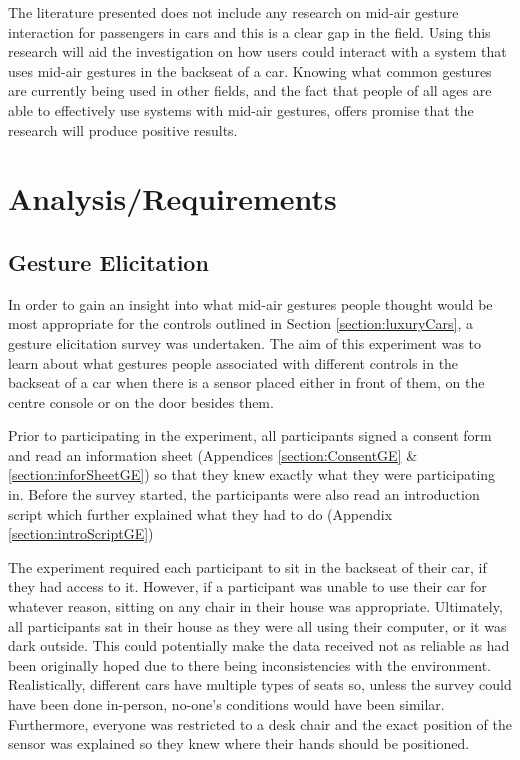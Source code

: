 \documentclass{l4proj}
\begin{document}
The literature presented does not include any research on mid-air gesture interaction for passengers in cars and this is a clear gap in the field. Using this research will aid the investigation on how users could interact with a system that uses mid-air gestures in the backseat of a car. Knowing what common gestures are currently being used in other fields, and the fact that people of all ages are able to effectively use systems with mid-air gestures, offers promise that the research will produce positive results.

\chapter{Analysis/Requirements}

\section{Gesture Elicitation}
In order to gain an insight into what mid-air gestures people thought would be most appropriate for the controls outlined in Section \ref{section:luxuryCars}, a gesture elicitation survey was undertaken. The aim of this experiment was to learn about what gestures people associated with different controls in the backseat of a car when there is a sensor placed either in front of them, on the centre console or on the door besides them. 

Prior to participating in the experiment, all participants signed a consent form and read an information sheet (Appendices \ref{section:ConsentGE} \& \ref{section:inforSheetGE}) so that they knew exactly what they were participating in. Before the survey started, the participants were also read an introduction script which further explained what they had to do (Appendix \ref{section:introScriptGE})

The experiment required each participant to sit in the backseat of their car, if they had access to it. However, if a participant was unable to use their car for whatever reason, sitting on any chair in their house was appropriate. Ultimately, all participants sat in their house as they were all using their computer, or it was dark outside. This could potentially make the data received not as reliable as had been originally hoped due to there being inconsistencies with the environment. Realistically, different cars have multiple types of seats so, unless the survey could have been done in-person, no-one’s conditions would have been similar. Furthermore, everyone was restricted to a desk chair and the exact position of the sensor was explained so they knew where their hands should be positioned.
\end{document}
